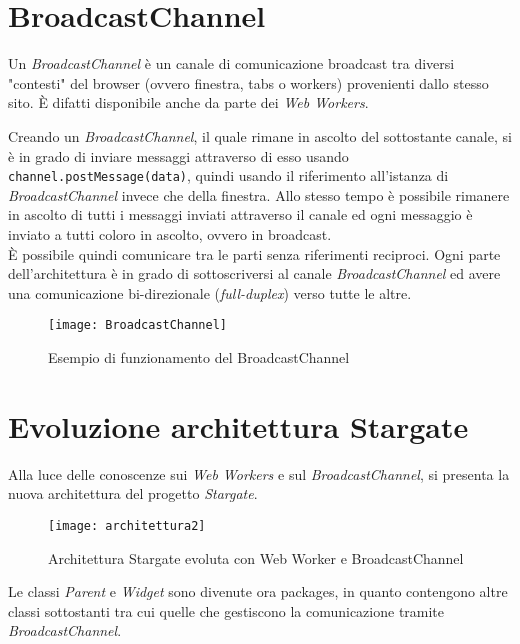 \section{BroadcastChannel}

Un \textit{BroadcastChannel} è un canale di comunicazione broadcast tra diversi "contesti" del browser (ovvero finestra, tabs o workers) provenienti dallo stesso sito. È difatti disponibile anche da parte dei \textit{Web Workers}.

Creando un \textit{BroadcastChannel}, il quale rimane in ascolto del sottostante canale, si è in grado di inviare messaggi attraverso di esso usando \texttt{channel.postMessage(data)}, quindi usando il riferimento all'istanza di \textit{BroadcastChannel} invece che della finestra. Allo stesso tempo è possibile rimanere in ascolto di tutti i messaggi inviati attraverso il canale ed ogni messaggio è inviato a tutti coloro in ascolto, ovvero in broadcast. \\

È possibile quindi comunicare tra le parti senza riferimenti reciproci. Ogni parte dell'architettura è in grado di sottoscriversi al canale \textit{BroadcastChannel} ed avere una comunicazione bi-direzionale (\textit{full-duplex}) verso tutte le altre.

\begin{figure}[H] 
  \centering 
  \texttt{[image: BroadcastChannel]} 
  \caption{Esempio di funzionamento del BroadcastChannel}
\end{figure}

\section{Evoluzione architettura Stargate}

Alla luce delle conoscenze sui \textit{Web Workers} e sul \textit{BroadcastChannel}, si presenta la nuova architettura del progetto \textit{Stargate}.

\begin{figure}[H] 
  \centering 
  \texttt{[image: architettura2]} 
  \caption{Architettura Stargate evoluta con Web Worker e BroadcastChannel}
\end{figure}

Le classi \textit{Parent} e \textit{Widget} sono divenute ora packages, in quanto contengono altre classi sottostanti tra cui quelle che gestiscono la comunicazione tramite \textit{BroadcastChannel}. \\

